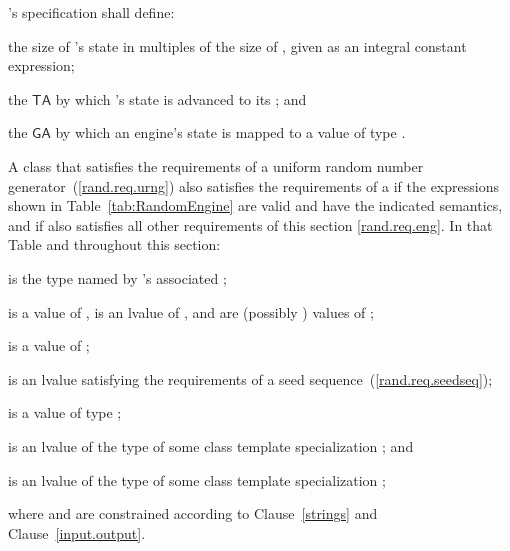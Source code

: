 \pnum
{}'s specification shall define:
\begin{enumeratea}
 \item
   the size of 's state
   in multiples of the size of ,
   given as an integral constant expression;
 \item
   the 
   $ \mathsf{TA} $
   by which 's state 
   is advanced to its 
   ;
 and
 \item
   the 
   $ \mathsf{GA} $
   by which an engine's state is mapped
   to a value of type .
\end{enumeratea}

\pnum
A class 
that satisfies the requirements
of a uniform random number generator~(\ref{rand.req.urng})
also satisfies the requirements
of a 
if the expressions shown
in Table~\ref{tab:RandomEngine}
are valid and have the indicated semantics,
and if  also satisfies all other requirements
of this section \ref{rand.req.eng}.
In that Table and throughout this section:
\begin{enumeratea}
  \item
     is the type named by
    's associated ;
  \item
     is a value of ,
     is an lvalue of ,
     and  are (possibly ) values of ;
  \item
     is a value of ;
  \item
     is an lvalue
    satisfying the requirements of a seed sequence~(\ref{rand.req.seedseq});
  \item
     is a value
    of type ;
  \item
     is an lvalue of the type of some class template specialization
     ;
  and
  \item
     is an lvalue of the type of some class template specialization
     ;
\end{enumeratea}
where  and  are constrained
according to Clause~\ref{strings} and Clause~\ref{input.output}.


